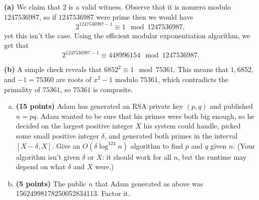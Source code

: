 \documentclass[11pt,letterpaper]{article}
\begin{document}
\begin{solution}
    \textbf{(a)} We claim that $2$ is a valid witness. Observe that it is nonzero modulo $1247536987$, so if $1247536987$ were prime then we would have
    \[
        2^{1247536987-1}\equiv 1\mod 1247536987
    ,\]  
    yet this isn't the case. Using the efficient modular exponentiation algorithm, we get that
    \[
        2^{1247536987-1}\equiv 448996154\mod 1247536987
    .\] 
    
    \textbf{(b)} A simple check reveals that $6852^2\equiv 1\mod 75361$. This means that $1, 6852,$ and $-1=75360$ are roots of $x^2-1$ modulo $75361$, which contradicts the primality of $75361$, so $75361$ is composite. 
\end{solution}

\pagebreak
\begin{problem}\noindent
    \begin{enumerate}[(a)]
        \item {\bf (15 points)} Adam has generated an RSA private key $(p,q)$ and published $n=pq$. Adam wanted to be sure that his primes were both big enough, so he decided on the largest positive integer $X$ his system could handle, picked some small positive integer $\delta$, and generated both primes in the interval $[X-\delta,X]$. Give an $O(\delta \log^{124} n)$ algorithm to find $p$ and $q$ given $n$. (Your algorithm isn't given $\delta$ or $X$: it should work for all $n$, but the runtime may depend on what $\delta$ and $X$ were.)
        \item {\bf (5 points)} The public $n$ that Adam generated as above was 15624998178250052834113. Factor it. 
    \end{enumerate}
\end{problem}
\end{document}
